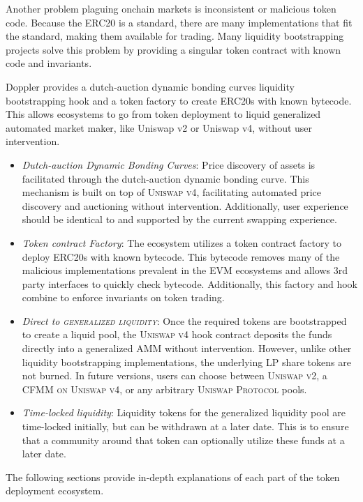 \documentclass[sigconf,nonacm,prologue,table]{acmart}
\numberwithin{equation}{section}
\theoremstyle{definition}
\theoremstyle{remark}
\begin{document}
Another problem plaguing onchain markets is inconsistent or malicious token code. Because the ERC20 is a standard, there are many implementations that fit the standard, making them available for trading. Many liquidity bootstrapping projects solve this problem by providing a singular token contract with known code and invariants.

Doppler provides a dutch-auction dynamic bonding curves liquidity bootstrapping hook and a token factory to create ERC20s with known bytecode. This allows ecosystems to go from token deployment to liquid generalized automated market maker, like Uniswap v2 or Uniswap v4, without user intervention. 

\begin{itemize}
    \item \emph{Dutch-auction Dynamic Bonding Curves}: Price discovery of assets is facilitated through the dutch-auction dynamic bonding curve. This mechanism is built on top of \textsc{Uniswap v4}, facilitating automated price discovery and auctioning without intervention. Additionally, user experience should be identical to and supported by the current swapping experience. 
    \item \emph{Token contract Factory}: The ecosystem utilizes a token contract factory to deploy ERC20s with known bytecode. This bytecode removes many of the malicious implementations prevalent in the EVM ecosystems and allows 3rd party interfaces to quickly check bytecode. Additionally, this factory and hook combine to enforce invariants on token trading.
    \item \emph{Direct to \textsc{generalized liquidity}}: Once the required tokens are bootstrapped to create a liquid pool, the \textsc{Uniswap v4} hook contract deposits the funds directly into a generalized AMM without intervention. However, unlike other liquidity bootstrapping implementations, the underlying LP share tokens are not burned. In future versions, users can choose between \textsc{Uniswap v2}, a \textsc{CFMM on Uniswap v4}, or any arbitrary \textsc{Uniswap Protocol} pools.
    \item \emph{Time-locked liquidity}: Liquidity tokens for the generalized liquidity pool are time-locked initially, but can be withdrawn at a later date. This is to ensure that a community around that token can optionally utilize these funds at a later date.
\end{itemize}

The following sections provide in-depth explanations of each part of the token deployment ecosystem.
\end{document}
